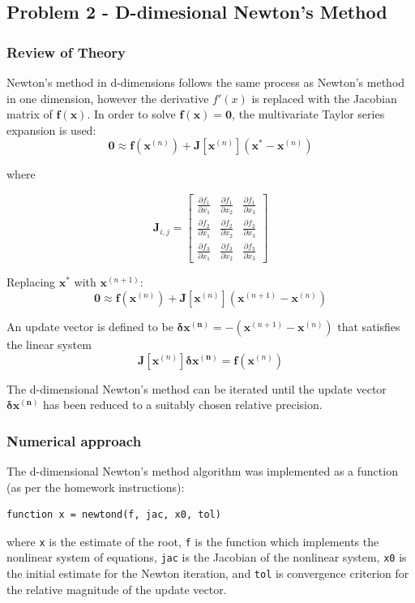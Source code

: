 \documentclass[10pt]{article}
\def\code#1{\texttt{#1}}
\begin{document}
\subsection*{Problem 2 - D-dimesional Newton's Method}

\subsubsection*{Review of Theory}

Newton's method in d-dimensions follows the same process as Newton's method in one dimension, however 
the derivative $f'(x)$ is replaced with the Jacobian matrix of $\mathbf{f}(\mathbf{x})$. In order to 
solve $\mathbf{f}(\mathbf{x})=\mathbf{0}$, the multivariate Taylor series expansion is used:
$$\mathbf{0} \approx \mathbf{f}(\mathbf{x}^{(n)}) + \mathbf{J}[\mathbf{x}^{(n)}](\mathbf{x}^* -
\mathbf{x}^{(n)})$$

where

\[
\mathbf{J}_{i,j} =
\begin{bmatrix}
  \frac{\partial f_1}{\partial x_1} & 
    \frac{\partial f_1}{\partial x_2} & 
    \frac{\partial f_1}{\partial x_3} \\[1ex] %
  \frac{\partial f_2}{\partial x_1} & 
    \frac{\partial f_2}{\partial x_2} & 
    \frac{\partial f_2}{\partial x_3} \\[1ex]
  \frac{\partial f_3}{\partial x_1} & 
    \frac{\partial f_3}{\partial x_2} & 
    \frac{\partial f_3}{\partial x_3}
\end{bmatrix}
\]

Replacing $\mathbf{x}^*$ with $\mathbf{x}^{(n+1)}$:
$$\mathbf{0} \approx \mathbf{f}(\mathbf{x}^{(n)}) + \mathbf{J}[\mathbf{x}^{(n)}](\mathbf{x}^{(n+1)} -
\mathbf{x}^{(n)})$$

An update vector is defined to be $\mathbf{\delta x^{(n)}} = -(\mathbf{x}^{(n+1)}-\mathbf{x}^{(n)})$ that
satisfies the linear system 
$$\mathbf{J}[\mathbf{x}^{(n)}]\mathbf{\delta x^{(n)}} = \mathbf{f}(\mathbf{x}^{(n)})$$

The d-dimensional Newton's method can be iterated until the update vector $\mathbf{\delta x^{(n)}}$ has 
been reduced to a suitably chosen relative precision. 

\subsubsection*{Numerical approach}

The d-dimensional Newton's method algorithm was implemented as a function (as per the homework instructions):
\begin{verbatim}
function x = newtond(f, jac, x0, tol)
\end{verbatim}
where \code{x} is the estimate of the root, \code{f} is the function which implements the nonlinear system of 
equations, \code{jac} is the Jacobian of the nonlinear system, \code{x0} is the initial estimate for the Newton
iteration, and \code{tol} is convergence criterion for the relative magnitude of the update vector.
\end{document}
